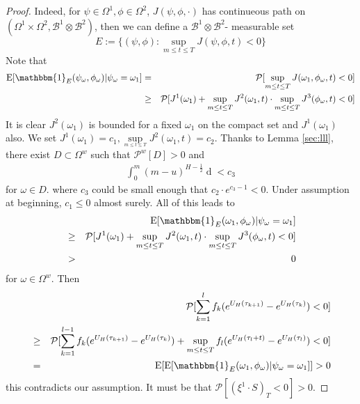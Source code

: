 \documentclass[a4paper, twoside, 11pt]{article}
\theoremstyle{definition}
\begin{document}
\begin{proof}
Indeed, for $\psi\in\Omega^1, \phi\in\Omega^2$, $J(\psi, \phi, \cdot)$ has continueous path on $(\Omega^1 \times \Omega^2, \mathscr{B}^1\otimes\mathscr{B}^2)$, then we can define a $\mathscr{B}^1\otimes\mathscr{B}^2$- measurable set
$$
E := \{(\psi, \phi) : \sup\limits_{m\le t\le T} J(\psi, \phi, t) < 0\}
$$
Note that
\begin{eqnarray*}
  \mathrm{E} [\mathbbm{1}_{E}(\psi_{\omega}, \phi_{\omega})| \psi_{\omega}=\omega_1] &=& \mathcal{P}[\sup\limits_{m\le t \le T} J(\omega_1, \phi_{\omega}, t) < 0] \\
  &\ge& \mathcal{P}[J^1(\omega_1) + \sup\limits_{m\le t \le T}J^2(\omega_1, t) \cdot \sup\limits_{m\le t \le T}J^3(\phi_{\omega}, t) < 0]
\end{eqnarray*}
It is clear $J^2(\omega_1)$ is bounded for a fixed $\omega_1$ on the compact set and $J^1(\omega_1)$ also. We set $J^1(\omega_1) = c_1 , \sup\limits_{_{m\le t \le T}}J^2(\omega_1, t) = c_2$. Thanks to Lemma \ref{sec:lll}, there exist $D \subset \Omega^{w} $  such that $\mathcal{P}^{w}[D] >0$ and 
\begin{eqnarray*}
  \int_0^{m}(m-u)^{H-\frac{1}{2}}\mathop{d \phi_{\omega}(u)} < c_3 
\end{eqnarray*}
for $\omega \in D$.
where $c_3$ could be small enough that $c_2 \cdot e^{c_3 - 1} < 0 $. Under assumption at beginning, $c_1 \le 0$ almost surely. All of this leads to 
\begin{eqnarray*}
  && \mathrm{E} [\mathbbm{1}_{E}(\omega_1, \phi_{\omega})| \psi_{\omega}=\omega_1]\\ 
  &\ge& \mathcal{P}[J^1(\omega_1) + \sup\limits_{m\le t \le T}J^2(\omega_1, t) \cdot \sup\limits_{m\le t \le T}J^3(\phi_{\omega}, t) < 0]\\
  &>& 0
\end{eqnarray*}
for $\omega \in \Omega^w$.
Then
\begin{eqnarray*}
  &&\mathcal{P}[\sum_{k=1}^{l} f_k (e^{U_H(\tau_{k+1})} - e^{U_H(\tau_k)}) < 0] \\
&\ge&\mathcal{P}[\sum_{k=1}^{l-1} f_k (e^{U_H(\tau_{k+1})}  - e^{U_H(\tau_{k})}) +  \sup\limits_{m\le t \le T}f_l(e^{U_H(\tau_l+t)}-e^{U_H(\tau_l)})  < 0]\\
&=& \mathrm{E}[ \mathrm{E} [\mathbbm{1}_{E}(\omega_1, \phi_{\omega})| \psi_{\omega}=\omega_1]] > 0
\end{eqnarray*}
this contradicts our assumption. It must be that ${\mathcal{P}}[(\xi^1 \cdot S)_T < 0] > 0$.
\end{proof}
\end{document}
